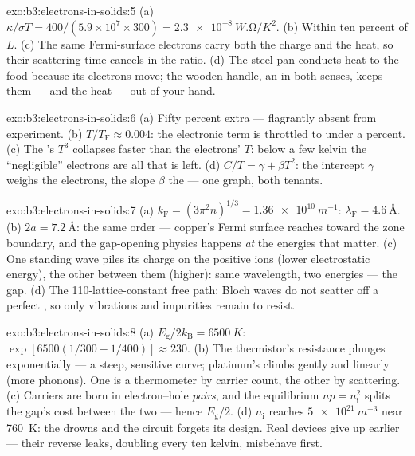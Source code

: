\begin{solution}{exo:b3:electrons-in-solids:5}
(a) $\kappa/\sigma T = 400/(5.9\times10^7\times300) =
\qty{2.3e-8}{W.\ohm/K^2}$. (b) Within ten percent of $L$. (c)
The same Fermi-surface electrons carry both the charge and the
heat, so their scattering time cancels in the ratio. (d) The
steel pan conducts heat to the food because its electrons move;
the wooden handle, an  in both senses, keeps them ---
and the heat --- out of your hand.
\end{solution}

\begin{solution}{exo:b3:electrons-in-solids:6}
(a) Fifty percent extra --- flagrantly absent from experiment.
(b) $T/T_{\text{F}} \approx 0.004$: the electronic term is
throttled to under a percent. (c) The 's $T^3$ collapses
faster than the electrons' $T$: below a few kelvin the
``negligible'' electrons are all that is left. (d) $C/T =
\gamma + \beta T^2$: the intercept $\gamma$ weighs the electrons,
the slope $\beta$ the  --- one graph, both tenants.
\end{solution}

\begin{solution}{exo:b3:electrons-in-solids:7}
(a) $k_{\text{F}} = (3\pi^2n)^{1/3} = \qty{1.36e10}{m^{-1}}$:
$\lambda_{\text{F}} = \qty{4.6}{\angstrom}$. (b) $2a =
\qty{7.2}{\angstrom}$: the same order --- copper's Fermi surface
reaches toward the zone boundary, and the gap-opening physics
happens \emph{at} the energies that matter. (c) One standing wave
piles its charge on the positive ions (lower electrostatic
energy), the other between them (higher): same wavelength, two
energies --- the gap. (d) The 110-lattice-constant free path:
Bloch waves do not scatter off a perfect , so only
vibrations and impurities remain to resist.
\end{solution}

\begin{solution}{exo:b3:electrons-in-solids:8}
(a) $E_{\text{g}}/2k_{\text{B}} = \qty{6500}{K}$:
$\exp[6500(1/300 - 1/400)] \approx 230$. (b) The thermistor's
resistance plunges exponentially --- a steep, sensitive curve;
platinum's climbs gently and linearly (more phonons). One is a
thermometer by carrier count, the other by scattering. (c)
Carriers are born in electron--hole \emph{pairs}, and the
equilibrium $np = n_{\text{i}}^2$ splits the gap's cost between
the two --- hence $E_{\text{g}}/2$. (d)
$n_{\text{i}}$ reaches $\qty{5e21}{m^{-3}}$ near \qty{760}{K}:
the  drowns and the circuit forgets its design. Real
devices give up earlier --- their reverse leaks, doubling every
ten kelvin, misbehave first.
\end{solution}

